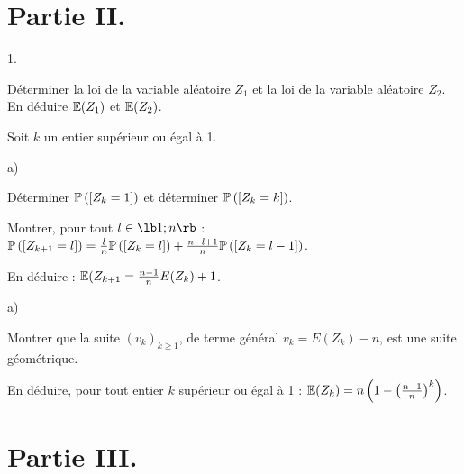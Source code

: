 \documentclass[11pt]{article}%
\begin{document}
\section*{Partie II.}

\begin{noliste}{1.}
 \setlength{\itemsep}{4mm}

\item Déterminer la loi de la variable aléatoire $Z_{1}$ et la loi de
la variable aléatoire $Z_{2}$. \\
En déduire $\mathbb{E}(Z_{1})$ et $\mathbb{E}(Z_{2})$. \\

\item Soit $k$ un entier supérieur ou égal à 1. 

\begin{noliste}{a)}
 \setlength{\itemsep}{2mm}

\item Déterminer $\mathbb{P}\left(\left[ {Z_{k} = 1} \right]\right)$ et déterminer
$\mathbb{P}\left(\left[ {Z_{k} = k} \right]\right)$. \\

\item Montrer, pour tout $l \in \lb 1 ; n \rb$ : $\mathbb{P}\left(\left[ {Z_{k +
1} = l } \right]\right) = \frac{l}{n} \mathbb{P}\left(\left[ {Z_{k} = l} \right]\right) +
\frac{n-l + 1}{n} \mathbb{P}\left(\left[ {Z_{k} = l-1} \right]\right)$. \\

\item En déduire : $\mathbb{E}(Z_{k + 1} = \frac{n-1}{n} E(Z_{k}) + 1$. \\

\end{noliste}

\item \begin{noliste}{a)}
 \setlength{\itemsep}{2mm}

\item Montrer que la suite $(v_{k})_{k \geq 1}$, de terme général
$v_{k} = E(Z_{k}) - n$, est une suite géométrique. \\

\item En déduire, pour tout entier $k$ supérieur ou égal à 1 :
$\mathbb{E}(Z_{k}) = n \left( 1 - \left( \frac{n-1}{n} \right)^{k} \right)$.

\end{noliste}

\end{noliste}

\section*{Partie III.}
\end{document}
